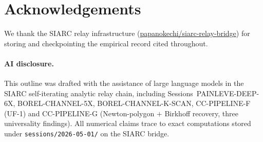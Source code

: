 \documentclass[11pt,reqno]{amsart}
\theoremstyle{plain}
\theoremstyle{definition}
\theoremstyle{remark}
\begin{document}
\section*{Acknowledgements}

We thank the SIARC relay infrastructure
(\href{https://github.com/papanokechi/siarc-relay-bridge}%
{papanokechi/siarc-relay-bridge}) for storing and
checkpointing the empirical record cited throughout.

\paragraph{AI disclosure.} This outline was drafted with the
assistance of large language models in the SIARC
self-iterating analytic relay chain, including
Sessions~PAINLEVE-DEEP-6X, BOREL-CHANNEL-5X,
BOREL-CHANNEL-K-SCAN, CC-PIPELINE-F (UF-1) and CC-PIPELINE-G
(Newton-polygon $+$ Birkhoff recovery, three universality
findings). All numerical claims trace to exact computations
stored under \texttt{sessions/2026-05-01/} on the SIARC
bridge.



\end{document}
